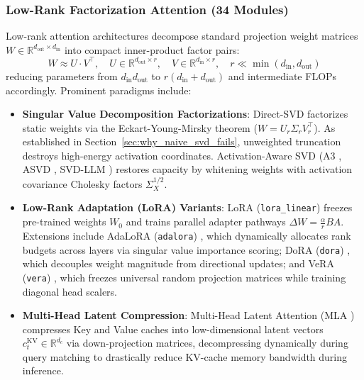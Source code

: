\documentclass{article}
\begin{document}
\subsubsection{Low-Rank Factorization Attention (34 Modules)}
Low-rank attention architectures decompose standard projection weight matrices $W \in \mathbb{R}^{d_{\text{out}} \times d_{\text{in}}}$ into compact inner-product factor pairs:
\begin{equation}
    W \approx U \cdot V^\top, \quad U \in \mathbb{R}^{d_{\text{out}} \times r}, \quad V \in \mathbb{R}^{d_{\text{in}} \times r}, \quad r \ll \min(d_{\text{in}}, d_{\text{out}})
\end{equation}
reducing parameters from $d_{\text{in}} d_{\text{out}}$ to $r(d_{\text{in}} + d_{\text{out}})$ and intermediate FLOPs accordingly. Prominent paradigms include:
\begin{itemize}
    \item \textbf{Singular Value Decomposition Factorizations}: Direct-SVD factorizes static weights via the Eckart-Young-Mirsky theorem ($W = U_r \Sigma_r V_r^\top$). As established in Section~\ref{sec:why_naive_svd_fails}, unweighted truncation destroys high-energy activation coordinates. Activation-Aware SVD (A3 \citep{a3_ours}, ASVD \citep{yuan2023asvd}, SVD-LLM \citep{wang2024svdllm}) restores capacity by whitening weights with activation covariance Cholesky factors $\Sigma_X^{1/2}$.
    \item \textbf{Low-Rank Adaptation (LoRA) Variants}: LoRA (\texttt{lora\_linear}) \citep{hu2022lora} freezes pre-trained weights $W_0$ and trains parallel adapter pathways $\Delta W = \frac{\alpha}{r} B A$. Extensions include AdaLoRA (\texttt{adalora}) \citep{zhang2023adalora}, which dynamically allocates rank budgets across layers via singular value importance scoring; DoRA (\texttt{dora}) \citep{liu2024dora}, which decouples weight magnitude from directional updates; and VeRA (\texttt{vera}) \citep{kopiczko2024vera}, which freezes universal random projection matrices while training diagonal head scalers.
    \item \textbf{Multi-Head Latent Compression}: Multi-Head Latent Attention (MLA \citep{deepseek2024mla}) compresses Key and Value caches into low-dimensional latent vectors $c_t^{\text{KV}} \in \mathbb{R}^{d_c}$ via down-projection matrices, decompressing dynamically during query matching to drastically reduce KV-cache memory bandwidth during inference.
\end{itemize}
\end{document}

